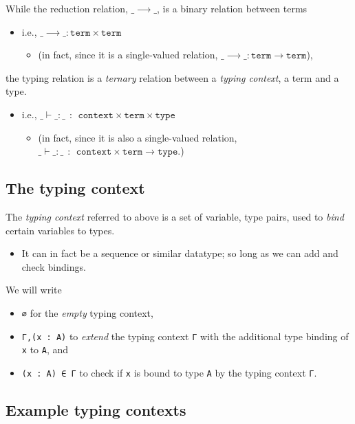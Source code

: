 \documentclass[11pt]{article}
\theoremstyle{definition}
\begin{document}
While the reduction relation, \(\_⟶\_\), is a binary relation between terms
\begin{itemize}
\item i.e., \(\_⟶\_ : \texttt{term} × \texttt{term}\)
\begin{itemize}
\item (in fact, since it is a single-valued relation, \(\_⟶\_ : \texttt{term} → \texttt{term}\)),
\end{itemize}
\end{itemize}
the typing relation is a \emph{ternary} relation between a \emph{typing context},
a term and a type.
\begin{itemize}
\item i.e., \(\_⊢\_:\_ \ \ : \ \ \texttt{context} × \texttt{term} × \texttt{type}\)
\begin{itemize}
\item (in fact, since it is also a single-valued relation,
\(\_⊢\_:\_ \ \ : \ \ \texttt{context} × \texttt{term} → \texttt{type}\).)
\end{itemize}
\end{itemize}

\subsection{The typing context}
\label{sec:orgba82482}

The \emph{typing context} referred to above is a set
of variable, type pairs, used to \emph{bind} certain variables to types.
\begin{itemize}
\item It can in fact be a sequence or similar datatype;
so long as we can add and check bindings.
\end{itemize}

We will write
\begin{itemize}
\item \texttt{∅} for the \emph{empty} typing context,
\item \texttt{Γ,(x : A)} to \emph{extend} the typing context \texttt{Γ} with the additional
type binding of \texttt{x} to \texttt{A}, and
\item \texttt{(x : A) ∈ Γ} to check if \texttt{x} is bound to type \texttt{A} by the typing context \texttt{Γ}.
\end{itemize}

\subsection{Example typing contexts}
\label{sec:org930042e}
\end{document}
